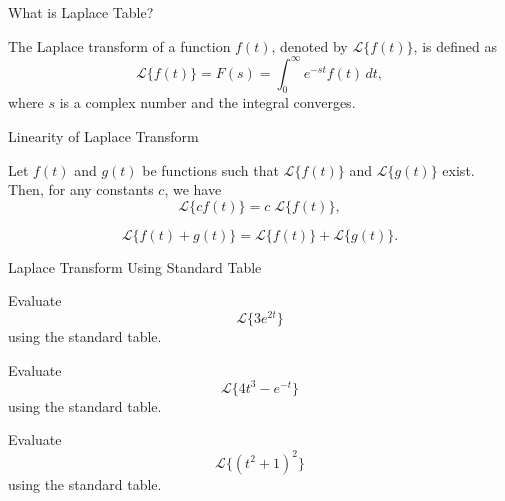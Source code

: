\documentclass[12pt, a4paper]{article}
\begin{document}
\FrontPage
\Large


\begin{heading}
	What is Laplace Table?
\end{heading}

\vspace{10pt}

\begin{definition}
	The Laplace transform of a function $f(t)$, denoted by $\mathcal{L}\{f(t)\}$, is defined as
	\[
	\mathcal{L}\{f(t)\} = F(s) = \int_0^\infty e^{-st} f(t) \, dt,
	\]
	where $s$ is a complex number and the integral converges.
	
\end{definition}

\clearpage

\begin{heading}
	Linearity of Laplace Transform
\end{heading}

\vspace{10pt}

\begin{theorem}
	Let $f(t)$ and $g(t)$ be functions such that $\mathcal{L}\{f(t)\}$ and $\mathcal{L}\{g(t)\}$ exist. Then, for any constants $c$, we have
	\[
	\mathcal{L}\{cf(t)\} = c\; \mathcal{L}\{f(t)\},
	\]

	\[
	\mathcal{L}\{f(t) + g(t)\} = \mathcal{L}\{f(t)\} + \mathcal{L}\{g(t)\}.
	\]
\end{theorem}

\clearpage	

\begin{heading}
	Laplace Transform Using Standard Table
\end{heading}

\vspace{10pt}

\begin{problem}
	Evaluate \[\mathcal{L}\{3e^{2t}\}\] using the standard table.
\end{problem}

\vspace{150pt}

\begin{problem}
	Evaluate \[\mathcal{L}\{4t^3 - e^{-t}\}\] using the standard table.
\end{problem}

\clearpage

\begin{problem}
	Evaluate \[\mathcal{L}\{(t^2+1)^2\}\] using the standard table.
\end{problem}
\end{document}
